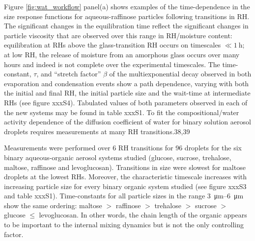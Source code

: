  Figure \ref{fig:wat_workflow} panel(a) shows examples of the time-dependence in the size response functions for aqueous-raffinose particles following transitions in RH. The significant changes in the equilibration time reflect the significant changes in particle viscosity that are observed over this range in RH/moisture content: equilibration at RHs above the glass-transition RH occurs on timescales $\ll \SI{1}{\hour}$; at low RH, the release of moisture from an amorphous glass occurs over many hours and indeed is not complete over the experimental timescales. The time-constant, $\tau$, and ``stretch factor” $\beta$ of the multiexponential decay observed in both evaporation and condensation events show a path dependence, varying with both the initial and final RH, the initial particle size and the wait-time at intermediate RHs (see figure xxxS4). Tabulated values of both parameters observed in each of the new systems may be found in table xxxS1. To fit the compositional/water activity dependence of the diffusion coefficient of water for binary solution aerosol droplets requires measurements at many RH transitions.38,39

Measurements were performed over 6 RH transitions for 96 droplets for the six binary aqueous-organic aerosol systems studied (glucose, sucrose, trehalose, maltose, raffinose and levoglucosan). Transitions in size were slowest for maltose droplets at the lowest RHs. Moreover, the characteristic timescale increases with increasing particle size for every binary organic system studied (see figure xxxS3 and table xxxS1). Time-constants for all particle sizes in the range \SIrange{3}{6}{\micro\meter} show the same ordering: maltose $>$ raffinose $>$ trehalose $>$ sucrose $>$ glucose $\le$ levoglucosan. In other words, the chain length of the organic appears to be important to the internal mixing dynamics but is not the only controlling factor.

